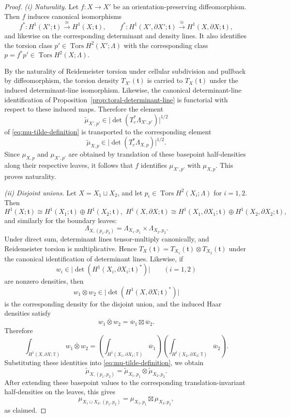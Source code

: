 \documentclass[10pt,a4paper]{amsart}
\begin{document}
\begin{proof}
\noindent
\emph{(i) Naturality.}
Let $f\colon X\to X'$ be an orientation-preserving diffeomorphism. Then $f$ induces canonical
isomorphisms
\[
f^*\colon H^1(X';\mathfrak t)\xrightarrow{\ \cong\ } H^1(X;\mathfrak t),
\qquad
f^*\colon H^1(X',\partial X';\mathfrak t)\xrightarrow{\ \cong\ } H^1(X,\partial X;\mathfrak t),
\]
and likewise on the corresponding determinant and density lines. It also identifies the torsion class
$p'\in \operatorname{Tors}H^2(X';\Lambda)$ with the corresponding class
$p=f^*p'\in \operatorname{Tors}H^2(X;\Lambda)$.

By the naturality of Reidemeister torsion under cellular subdivision and pullback by diffeomorphism, the
torsion density $T_{X'}(\mathfrak t)$ is carried to $T_X(\mathfrak t)$ under the induced determinant-line
isomorphism. Likewise, the canonical determinant-line identification of
Proposition~\ref{prop:toral-determinant-line} is functorial with respect to these induced maps. Therefore
the element
\[
\widetilde{\mu}_{X',p'}
\in \bigl|\det(T_e^*\Lambda_{X',p'})\bigr|^{1/2}
\]
of \eqref{eq:mu-tilde-definition} is transported to the corresponding element
\[
\widetilde{\mu}_{X,p}
\in \bigl|\det(T_e^*\Lambda_{X,p})\bigr|^{1/2}.
\]
Since $\mu_{X,p}$ and $\mu_{X',p'}$ are obtained by translation of these basepoint half-densities along
their respective leaves, it follows that $f$ identifies $\mu_{X',p'}$ with $\mu_{X,p}$. This proves
naturality.

\smallskip
\noindent
\emph{(ii) Disjoint unions.}
Let $X=X_1\sqcup X_2$, and let $p_i\in \operatorname{Tors}H^2(X_i;\Lambda)$ for $i=1,2$. Then
\[
H^1(X;\mathfrak t)\cong H^1(X_1;\mathfrak t)\oplus H^1(X_2;\mathfrak t),\,\,
H^1(X,\partial X;\mathfrak t)\cong
H^1(X_1,\partial X_1;\mathfrak t)\oplus H^1(X_2,\partial X_2;\mathfrak t),
\]
and similarly for the boundary leaves:
\[
\Lambda_{X,(p_1,p_2)}
=
\Lambda_{X_1,p_1}\times \Lambda_{X_2,p_2}.
\]
Under direct sum, determinant lines tensor-multiply canonically, and Reidemeister torsion is multiplicative.
Hence $T_X(\mathfrak t) = T_{X_1}(\mathfrak t)\otimes T_{X_2}(\mathfrak t)$
under the canonical identification of determinant lines. Likewise, if
\[
w_i\in \bigl|\det(H^1(X_i,\partial X_i;\mathfrak t)^*)\bigr|
\qquad (i=1,2)
\]
are nonzero densities, then
\[
w_1\otimes w_2
\in
\bigl|\det(H^1(X,\partial X;\mathfrak t)^*)\bigr|
\]
is the corresponding density for the disjoint union, and the induced Haar densities satisfy
\[
\overline{w_1\otimes w_2}
=
\overline{w}_1\boxtimes \overline{w}_2.
\]
Therefore
\[
\int_{H^1(X,\partial X;\mathbb T)} \overline{w_1\otimes w_2}
=
\left(\int_{H^1(X_1,\partial X_1;\mathbb T)} \overline{w}_1\right)
\left(\int_{H^1(X_2,\partial X_2;\mathbb T)} \overline{w}_2\right).
\]
Substituting these identities into \eqref{eq:mu-tilde-definition}, we obtain
\[
\widetilde{\mu}_{X,(p_1,p_2)}
=
\widetilde{\mu}_{X_1,p_1}\otimes \widetilde{\mu}_{X_2,p_2}.
\]
After extending these basepoint values to the corresponding translation-invariant half-densities on the leaves, this gives
\[
\mu_{X_1\sqcup X_2,(p_1,p_2)}
=
\mu_{X_1,p_1}\boxtimes \mu_{X_2,p_2},
\]
as claimed.


\end{proof}
\end{document}
